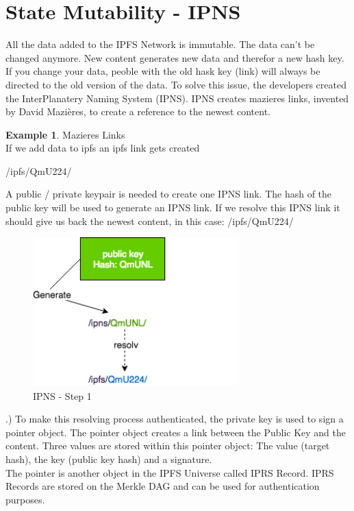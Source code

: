 \documentclass[a4paper,11pt, oneside]{report}
\theoremstyle{definition}
\newtheorem{exmp}{Example}[subsection]
\begin{document}
\newpage
\section{State Mutability - IPNS}
All the data added to the IPFS Network is immutable. The data can't be changed anymore. New content generates new data and therefor a new hash key. If you change your data, peoble with the old hask key (link) will always be directed to the old version of the data. To solve this issue, the developers created the InterPlanatery Naming System (IPNS). IPNS creates mazieres links, invented by David Mazières, to create a reference to the newest content.
\begin{exmp}{Mazieres Links}\\
If we add data to ipfs an ipfs link gets created
\begin{center}
	/ipfs/QmU224/
\end{center}
A public / private keypair is needed to create one IPNS link.  The hash of the public key will be used to generate an IPNS link. If we resolve this IPNS link it should give us back the newest content, in this case: /ipfs/QmU224/
\begin{figure}[H]
\centering
\includegraphics[width=0.7\textwidth]{img/ipns-1.png}
\caption[IPNS Step 1]{IPNS - Step 1}
\end{figure}
\newpage
{}.) To make this resolving process authenticated, the private key is used to sign a pointer object. The pointer object creates a link between the Public Key and the content. Three values are stored within this pointer object: The value (target hash), the key (public key hash) and a signature.\\
The pointer is another object in the IPFS Universe called IPRS Record. IPRS Records are stored on the Merkle DAG and can be used for authentication purposes.
\begin{figure}[H]

\end{figure}
\end{exmp}
\end{document}
